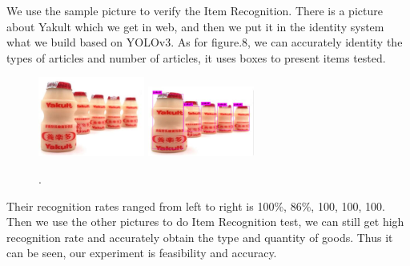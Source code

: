 We use the sample picture to verify the Item Recognition. There is a picture about Yakult which we get in web, and then we put it in the identity system what we build based on YOLOv3\cite{yolov3}. As for figure.8, we can accurately identity the types of articles and number of articles, it uses boxes to present items tested.
\begin{figure}[htbp]
\centerline{\includegraphics[width=3.5cm,scale=0.6]{Yakult.jpg} \includegraphics[width=3.5cm,scale=0.6]{Yakult_new.jpg}}
\caption{.}
\label{fig}
\end{figure}

Their recognition rates ranged from left to right is 100\%, 86\%, 100, 100, 100. Then we use the other pictures to do Item Recognition test, we can still get high recognition rate and accurately obtain the type and quantity of goods. Thus it can be seen, our experiment is feasibility and accuracy.
